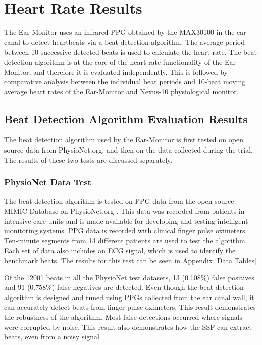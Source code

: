 
\section{Heart Rate Results}
The Ear-Monitor uses an infrared PPG obtained by the MAX30100 in the ear canal to detect heartbeats via a beat detection algorithm. The average period between 10 successive detected beats is used to calculate the heart rate. The beat detection algorithm is at the core of the heart rate functionality of the Ear-Monitor, and therefore it is evaluated independently. This is followed by comparative analysis between the individual beat periods and 10-beat moving average heart rates of the Ear-Monitor and Nexus-10 physiological monitor.

\subsection{Beat Detection Algorithm Evaluation Results}
The beat detection algorithm used by the Ear-Monitor is first tested on open source data from PhysioNet.org, and then on the data collected during the trial. The results of these two tests are discussed separately.

\subsubsection{PhysioNet Data Test}
The beat detection algorithm is tested on PPG data from the open-source MIMIC Database on PhysioNet.org \citep{PhysioNet}. This data was recorded from patients in intensive care units and is made available for developing and testing intelligent monitoring systems. PPG data is recorded with clinical finger pulse oximeters. Ten-minute segments from 14 different patients are used to test the algorithm. Each set of data also includes an ECG signal, which is used to identify the benchmark beats. The results for this test can be seen in Appendix \ref{Data Tables}.

\medskip

Of the 12001 beats in all the PhysioNet test datasets, 13 (0.108\%) false positives and 91 (0.758\%) false negatives are detected. Even though the beat detection algorithm is designed and tuned using PPGs collected from the ear canal wall, it can accurately detect beats from finger pulse oximeters. This result demonstrates the robustness of the algorithm. Most false detections occurred where signals were corrupted by noise. This result also demonstrates how the SSF can extract beats, even from a noisy signal.

